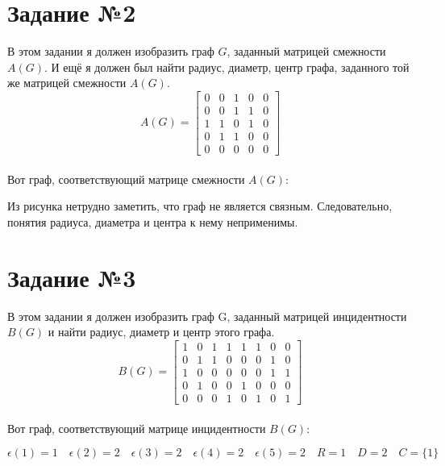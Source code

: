 \documentclass[12pt]{article}
\begin{document}
\section*{Задание №2}
В этом задании я должен изобразить граф $G$, заданный матрицей смежности $A(G)$.
И ещё я должен был найти радиус, диаметр, центр графа, заданного той же матрицей смежности $A(G)$.
\[
A(G) = \begin{bmatrix}
	0 & 0 & 1 & 0 & 0\\
	0 & 0 & 1 & 1 & 0\\
	1 & 1 & 0 & 1 & 0\\
	0 & 1 & 1 & 0 & 0\\
	0 & 0 & 0 & 0 & 0
\end{bmatrix}
\]
\\ Вот граф, соответствующий матрице смежности $A(G)$: \\
\begin{center}
\end{center}
Из рисунка нетрудно заметить, что граф не является связным. Следовательно, понятия радиуса, диаметра и центра к нему неприменимы.


\section*{Задание №3}
В этом задании я должен изобразить граф G, заданный матрицей инцидентности $B(G)$
и найти радиус, диаметр и центр этого графа.
\[
B(G) = \begin{bmatrix}
	1 & 0 & 1 & 1 & 1 & 1 & 0 & 0\\
	0 & 1 & 1 & 0 & 0 & 0 & 1 & 0\\
	1 & 0 & 0 & 0 & 0 & 0 & 1 & 1\\
	0 & 1 & 0 & 0 & 1 & 0 & 0 & 0\\
	0 & 0 & 0 & 1 & 0 & 1 & 0 & 1
\end{bmatrix}
\]
\\ Вот граф, соответствующий матрице инцидентности $B(G)$: \\
\begin{center}
\end{center}
\[
	\epsilon(1) = 1 \quad \epsilon(2) = 2 \quad \epsilon(3) = 2 \quad
	\epsilon(4) = 2 \quad \epsilon(5) = 2 \quad R = 1 \quad D = 2 \quad
	C = \{1\}
\]
\end{document}
